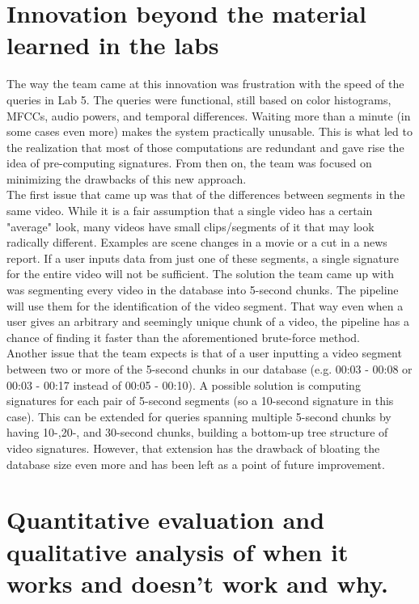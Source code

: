 \documentclass{article}
\newcommand\tab[1][1cm]{\hspace*{#1}}
\begin{document}
\section*{Innovation beyond the material learned in the labs}

 \tab The way the team came at this innovation was frustration with the speed of the queries in Lab 5. The queries were functional, still  based on color histograms, MFCCs, audio powers, and temporal differences. Waiting more than a minute (in some cases even more) makes the system practically unusable. This is what led to the realization that most of those computations are redundant and gave rise the idea of pre-computing signatures. From then on, the team was focused on minimizing the drawbacks of this new approach.
\\ \tab The first issue that came up was that of the differences between segments in the same video. While it is a fair assumption that a single video has a certain "average" look, many videos have small clips/segments of it that may look radically different. Examples are scene changes in a movie or a cut in a news report. If a user inputs data from just one of these segments, a single signature for the entire video will not be sufficient. The solution the team came up with was segmenting every video in the database into 5-second chunks. The pipeline will use them for the identification of the video segment. That way even when a user gives an arbitrary and seemingly unique chunk of a video, the pipeline has a chance of finding it faster than the aforementioned brute-force method. 
\\ \tab Another issue that the team expects is that of a user inputting a video segment  between two or more of the 5-second chunks in our database (e.g. 00:03 - 00:08 or 00:03 - 00:17 instead of 00:05 - 00:10). A possible solution is computing signatures for each pair of 5-second segments (so a 10-second signature in this case). This can be extended for queries spanning multiple 5-second chunks by having 10-,20-, and 30-second chunks, building a bottom-up tree structure of video signatures. However, that extension has the drawback of bloating the database size even more and has been left as a point of future improvement.

\section*{Quantitative evaluation and qualitative analysis of when it works and doesn't work
and why.}
\end{document}
